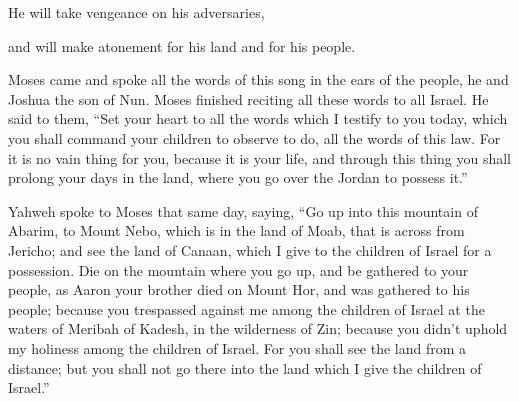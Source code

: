 {\par }{\QB He will take vengeance on his adversaries,
\par }{\QB and will make atonement for his land and for his people.
\par }{\PP {}Moses came and spoke all the words of this song in the ears of the people, he and Joshua the son of Nun.
Moses finished reciting all these words to all Israel.
He said to them, “Set your heart to all the words which I testify to you today, which you shall command your children to observe to do, all the words of this law.
For it is no vain thing for you, because it is your life, and through this thing you shall prolong your days in the land, where you go over the Jordan to possess it.”
\par }{\PP {}Yahweh spoke to Moses that same day, saying,
“Go up into this mountain of Abarim, to Mount Nebo, which is in the land of Moab, that is across from Jericho; and see the land of Canaan, which I give to the children of Israel for a possession.
Die on the mountain where you go up, and be gathered to your people, as Aaron your brother died on Mount Hor, and was gathered to his people;
because you trespassed against me among the children of Israel at the waters of Meribah of Kadesh, in the wilderness of Zin; because you didn’t uphold my holiness among the children of Israel.
For you shall see the land from a distance; but you shall not go there into the land which I give the children of Israel.”

}
